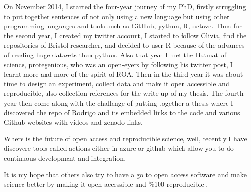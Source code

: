 \documentclass[11pt]{article}
\begin{document}
On November 2014, I started the four-year journey of my PhD,
firstly struggling to put together sentences of not only using 
a new language but using other programming languages and 
tools such as GitHub, python, R, octave. 
Then for the second year, I created my twitter account, I started
to follow Olivia, find the repositories of Bristol researcher, and
decided to user R because of the advances of reading huge datasets
than python. Also that year I met the Batmat of science, protegenious,
who was an open-eyers by following his twitter post, I learnt 
more and more of the spirit of ROA.
Then in the third year it was about time to design an experiment, 
collect data and make it open accessible and reproducible,
also collection references for the write up of my thesis. 
The fourth year then come along with the challenge of 
putting together a thesis where I discovered the repo of 
Rodrigo and its embedded links to the code
and various Github websites with videos and zenodo links.



Where is the future of open access and reproducible science,
well, recently I have discovere tools called actions either in 
azure or github which allow you to do  continuous development and 
integration.

 
It is my hope that others also try to have a go to
open access software and make science better by making it
open accessible and \%100 reproducible 
\citep{xochicale2019-github}.








\end{document}
